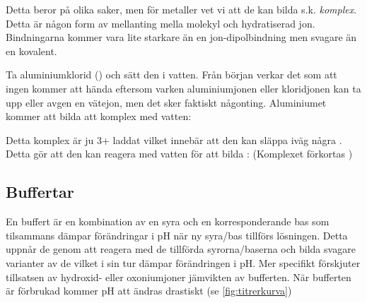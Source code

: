 Detta beror på olika saker, men för metaller vet vi att de kan bilda s.k. \emph{komplex}. Detta är någon form av mellanting mella molekyl och hydratiserad jon. Bindningarna kommer vara lite starkare än en jon-dipolbindning men svagare än en kovalent.
\begin{exm}
    Ta aluminiumklorid () och sätt den i vatten. Från början verkar det som att ingen kommer att hända eftersom varken aluminiumjonen eller kloridjonen kan ta upp eller avgen en vätejon, men det sker faktiskt någonting. Aluminiumet kommer att bilda att komplex med vatten:
    \begin{center}
    \end{center}
    Detta komplex är ju 3+ laddat vilket innebär att den kan släppa iväg några . Detta gör att den kan reagera med vatten för att bilda : (Komplexet förkortas )
    \begin{center}
    \end{center}
\end{exm}

\subsection{Buffertar}
\label{sec:buffertar}
En buffert är en kombination av en syra och en korresponderande bas som tilsammans dämpar förändringar i pH när ny syra/bas tillförs lösningen. Detta uppnår de genom att reagera med de tillförda syrorna/baserna och bilda svagare varianter av de vilket i sin tur dämpar förändringen i pH. Mer specifikt förskjuter tillsatsen av hydroxid- eller oxoniumjoner jämvikten av bufferten. När bufferten är förbrukad kommer pH att ändras drastiskt (se \vref{fig:titrerkurva}) 

